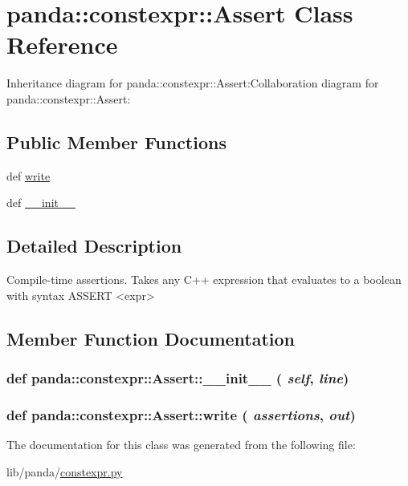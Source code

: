 \hypertarget{classpanda_1_1constexpr_1_1Assert}{
\section{panda::constexpr::Assert Class Reference}
\label{classpanda_1_1constexpr_1_1Assert}
}
Inheritance diagram for panda::constexpr::Assert:Collaboration diagram for panda::constexpr::Assert:\subsection*{Public Member Functions}
\begin{DoxyCompactItemize}
\item 
def \hyperlink{classpanda_1_1constexpr_1_1Assert_a938cdb87048769025407d91309aa4ce6}{write}
\item 
def \hyperlink{classpanda_1_1constexpr_1_1Assert_a1f7793e484cfd35b5d7bd7ba76ad251a}{\_\-\_\-init\_\-\_\-}
\end{DoxyCompactItemize}


\subsection{Detailed Description}
\begin{DoxyVerb}
Compile-time assertions.
Takes any C++ expression that evaluates to a boolean with syntax
ASSERT <expr>
\end{DoxyVerb}
 

\subsection{Member Function Documentation}
\hypertarget{classpanda_1_1constexpr_1_1Assert_a1f7793e484cfd35b5d7bd7ba76ad251a}{
\subsubsection[{\_\-\_\-init\_\-\_\-}]{\setlength{\rightskip}{0pt plus 5cm}def panda::constexpr::Assert::\_\-\_\-init\_\-\_\- ( {\em self}, \/   {\em line})}}
\label{classpanda_1_1constexpr_1_1Assert_a1f7793e484cfd35b5d7bd7ba76ad251a}
\hypertarget{classpanda_1_1constexpr_1_1Assert_a938cdb87048769025407d91309aa4ce6}{
\subsubsection[{write}]{\setlength{\rightskip}{0pt plus 5cm}def panda::constexpr::Assert::write ( {\em assertions}, \/   {\em out})}}
\label{classpanda_1_1constexpr_1_1Assert_a938cdb87048769025407d91309aa4ce6}


The documentation for this class was generated from the following file:\begin{DoxyCompactItemize}
\item 
lib/panda/\hyperlink{constexpr_8py}{constexpr.py}\end{DoxyCompactItemize}

